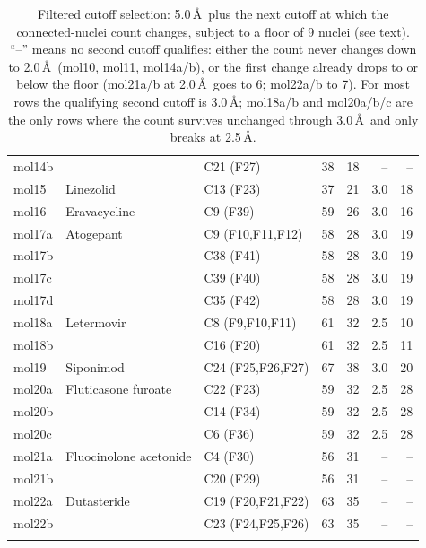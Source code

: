 \documentclass[11pt]{article}
\begin{document}
\begin{longtable}{@{}l l l r r r r@{}}
mol14b   &                          & C21 (F27)              &  38 &  18 & --   &  -- \\
mol15    & Linezolid                & C13 (F23)              &  37 &  21 & 3.0  &  18 \\
mol16    & Eravacycline             & C9 (F39)               &  59 &  26 & 3.0  &  16 \\
mol17a   & Atogepant                & C9 (F10,F11,F12)       &  58 &  28 & 3.0  &  19 \\
mol17b   &                          & C38 (F41)              &  58 &  28 & 3.0  &  19 \\
mol17c   &                          & C39 (F40)              &  58 &  28 & 3.0  &  19 \\
mol17d   &                          & C35 (F42)              &  58 &  28 & 3.0  &  19 \\
mol18a   & Letermovir               & C8 (F9,F10,F11)        &  61 &  32 & 2.5  &  10 \\
mol18b   &                          & C16 (F20)              &  61 &  32 & 2.5  &  11 \\
mol19    & Siponimod                & C24 (F25,F26,F27)      &  67 &  38 & 3.0  &  20 \\
mol20a   & Fluticasone furoate      & C22 (F23)              &  59 &  32 & 2.5  &  28 \\
mol20b   &                          & C14 (F34)              &  59 &  32 & 2.5  &  28 \\
mol20c   &                          & C6 (F36)               &  59 &  32 & 2.5  &  28 \\
mol21a   & Fluocinolone acetonide   & C4 (F30)               &  56 &  31 & --   &  -- \\
mol21b   &                          & C20 (F29)              &  56 &  31 & --   &  -- \\
mol22a   & Dutasteride              & C19 (F20,F21,F22)      &  63 &  35 & --   &  -- \\
mol22b   &                          & C23 (F24,F25,F26)      &  63 &  35 & --   &  -- \\
\bottomrule
\caption{Filtered cutoff selection: 5.0\,\AA\ plus the next cutoff at which
the connected-nuclei count changes, subject to a floor of 9 nuclei (see
text). ``--'' means no second cutoff qualifies: either the count never
changes down to 2.0\,\AA\ (mol10, mol11, mol14a/b), or the first change
already drops to or below the floor (mol21a/b at 2.0\,\AA\ goes to 6;
mol22a/b to 7). For most rows the qualifying second cutoff is 3.0\,\AA;
mol18a/b and mol20a/b/c are the only rows where the count survives
unchanged through 3.0\,\AA\ and only breaks at
2.5\,\AA.\label{tab:filtered}}
\end{longtable}
\end{document}
